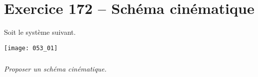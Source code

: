 \section*{Exercice 172 -- Schéma cinématique}

\setcounter{exo}{0}

Soit le système suivant. 

\begin{center}
 \texttt{[image: 053\_01]}
\end{center}



\subparagraph{}
\textit{Proposer un schéma cinématique.}
 \ifprof
 \begin{corrige}
 
 \end{corrige}
 \else
 \fi

